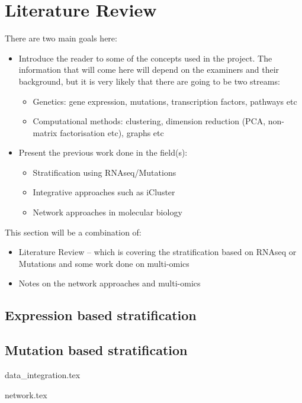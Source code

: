 \section{Literature Review}

There are two main goals here:
\begin{itemize}
    \item Introduce the reader to some of the concepts used in the project. The information that will come here will depend on the examiners and their background, but it is very likely that there are going to be two streams:
    \begin{itemize}
        \item Genetics: gene expression, mutations, transcription factors, pathways etc
        \item Computational methods: clustering, dimension reduction (PCA, non-matrix factorisation etc), graphs etc 
    \end{itemize}
    \item Present the previous work done in the field(s):
    \begin{itemize}
        \item Stratification using RNAseq/Mutations
        \item Integrative approaches such as iCluster
        \item Network approaches in molecular biology  
    \end{itemize}
\end{itemize}

This section will be a combination of:
\begin{itemize}
    \item Literature Review -- which is covering the stratification based on RNAseq or Mutations and some work done on multi-omics
    \item Notes on the network approaches and multi-omics
\end{itemize}


\subsection{Expression based stratification}
\subsection{Mutation based stratification}

{data_integration.tex}

{network.tex}


